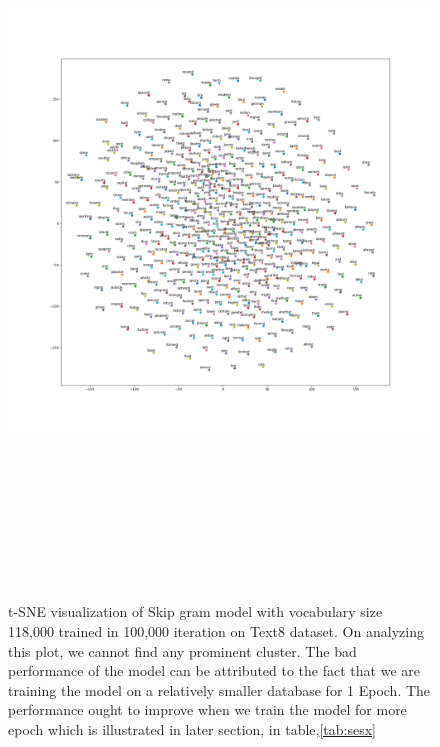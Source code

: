 \begin{figure}[H]
	\hskip-2cm
	\includegraphics[width=20cm,height=20cm,keepaspectratio]{files/enText8-20kExtendedVocab/w2vtsne.png}
	\caption{t-SNE visualization of Skip gram model with vocabulary size 118,000 trained in 100,000 iteration on Text8 dataset. On analyzing this plot, we cannot find any prominent cluster. The bad performance of the model can be attributed to the fact that we are training the model on a relatively smaller database for 1 Epoch. The performance ought to improve when we train the model for more epoch which is illustrated in later section, in table,\ref{tab:sesx}}
	\label{fig:tsnee1}
\end{figure}
